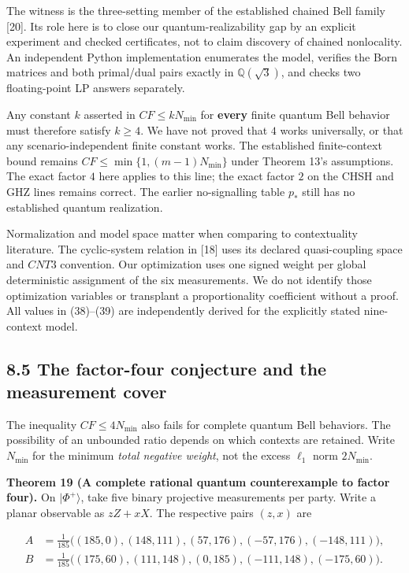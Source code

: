 \documentclass[
]{article}
\begin{document}
The witness is the three-setting member of the established chained Bell family {[}20{]}. Its role here is to close our quantum-realizability gap by an explicit experiment and checked certificates, not to claim discovery of chained nonlocality. An independent Python implementation enumerates the model, verifies the Born matrices and both primal/dual pairs exactly in \(\mathbb Q(\sqrt3)\), and checks two floating-point LP answers separately.

Any constant \(k\) asserted in \(CF\le kN_{\min}\) for \textbf{every} finite quantum Bell behavior must therefore satisfy \(k\ge4\). We have not proved that \(4\) works universally, or that any scenario-independent finite constant works. The established finite-context bound remains \(CF\le\min\{1,(m-1)N_{\min}\}\) under Theorem 13's assumptions. The exact factor \(4\) here applies to this line; the exact factor \(2\) on the CHSH and GHZ lines remains correct. The earlier no-signalling table \(p_*\) still has no established quantum realization.

Normalization and model space matter when comparing to contextuality literature. The cyclic-system relation in {[}18{]} uses its declared quasi-coupling space and \(CNT3\) convention. Our optimization uses one signed weight per global deterministic assignment of the six measurements. We do not identify those optimization variables or transplant a proportionality coefficient without a proof. All values in (38)--(39) are independently derived for the explicitly stated nine-context model.

\subsection{8.5 The factor-four conjecture and the measurement cover}\label{the-factor-four-conjecture-and-the-measurement-cover}

The inequality \(CF\le4N_{\min}\) also fails for complete quantum Bell behaviors. The possibility of an unbounded ratio depends on which contexts are retained. Write \(N_{\min}\) for the minimum \emph{total negative weight}, not the excess \(\ell_1\) norm \(2N_{\min}\).

\textbf{Theorem 19 (A complete rational quantum counterexample to factor four).} On \(|\Phi^+\rangle\), take five binary projective measurements per party. Write a planar observable as \(zZ+xX\). The respective pairs \((z,x)\) are

\[
\begin{aligned}
A&=\frac1{185}\big((185,0),(148,111),(57,176),(-57,176),(-148,111)\big),\\
B&=\frac1{185}\big((175,60),(111,148),(0,185),(-111,148),(-175,60)\big).
\end{aligned}
\]
\end{document}
